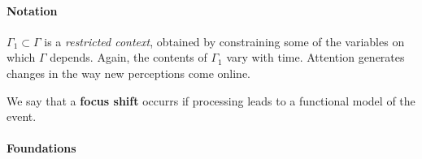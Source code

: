 \paragraph{\textbf{\upshape Notation}}

$\Gamma_1 \subset \Gamma$ is a \emph{restricted context}, obtained by
constraining some of the variables on which $\Gamma$ depends.  Again,
the contents of $\Gamma_1$ vary with time.  Attention generates
changes in the way new perceptions come online.

\begin{center}
\asterism
\end{center}

\begin{defn}\label{def:interest}
\hypertarget{def:interest}{} We say that a \textbf{focus shift}
occurrs if processing leads to a functional model of the event.
\end{defn}


\paragraph{\textbf{\upshape Foundations}}
                                         
